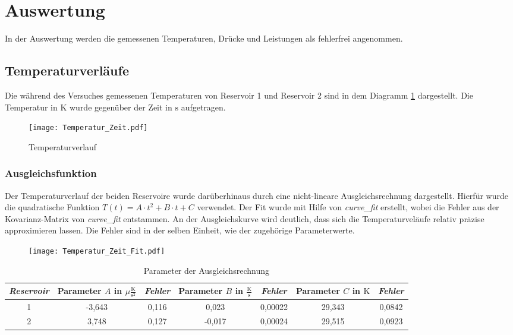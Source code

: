 \newpage
\section{Auswertung}
In der Auswertung werden die gemessenen Temperaturen, Drücke und Leistungen als fehlerfrei angenommen.
\subsection{Temperaturverläufe}
Die während des Versuches gemessenen Temperaturen von Reservoir 1 und Reservoir 2 sind in dem Diagramm \ref{fig:Temperaturverlauf} dargestellt.
Die Temperatur in $\si{\kelvin}$ wurde gegenüber der Zeit in $\si{\second}$ aufgetragen.
\begin{figure}
  \centering
  \texttt{[image: Temperatur\_Zeit.pdf]}
  \caption{Temperaturverlauf}
  \label{fig:Temperaturverlauf}
\end{figure}
\subsubsection{Ausgleichsfunktion}
Der Temperaturverlauf der beiden Reservoire wurde darüberhinaus durch eine nicht-lineare Ausgleichsrechnung dargestellt.
Hierfür wurde die quadratische Funktion $T(t) = A\cdot t^2 + B\cdot t + C$ verwendet. Der Fit wurde mit Hilfe von \textit{curve\_fit} erstellt, wobei die Fehler aus der Kovarianz-Matrix von \textit{curve\_fit} entstammen. An der Ausgleichskurve wird deutlich, dass sich die Temperaturveläufe relativ präzise approximieren lassen. Die Fehler sind in der selben Einheit, wie der zugehörige Parameterwerte.

\begin{figure}
  \centering
  \texttt{[image: Temperatur\_Zeit\_Fit.pdf]}
  \label{fig:Temperaturverlauf_Fit}
\end{figure}
\begin{table}
   \centering
   \caption{Parameter der Ausgleichsrechnung}
   \label{tab:Ausgleichsrechnung}
   \begin{tabular}[width=0.4\textwidth]{S[table-format=1.0] S[table-format=1.3] S[table-format=1.3] S[table-format=1.4] S[table-format=1.5] S[table-format=2.3] S[table-format=1.4]}
       \toprule
       {\footnotesize{\emph{Reservoir}}}  & {\footnotesize{Parameter} $A$ \footnotesize{in} $\mu\frac{\si{\kelvin}}{\si{\second}^2}$} & {\footnotesize{\emph{Fehler}}} & {\footnotesize{Parameter} $B$ \footnotesize{in}  $\frac{\si{\kelvin}}{\si{\second}}$} & {\footnotesize{\emph{Fehler}}} & {\footnotesize{Parameter} $C$ \footnotesize{in} $\si{\kelvin}$} & {\footnotesize{\emph{Fehler}}} \\
        & -3,643 & 0,116 & 0,023 & 0,00022 & 29,343 & 0,0842 \\
       2 & 3,748 & 0,127 & -0,017 & 0,00024 & 29,515 & 0,0923 \\
       \bottomrule
   \end{tabular}
\end{table}
\FloatBarrier
